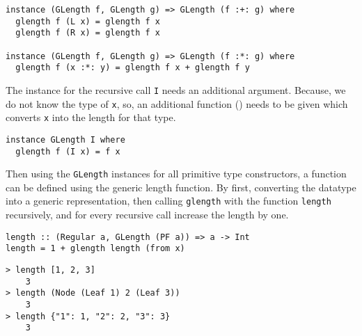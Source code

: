 \begin{verbatim}
instance (GLength f, GLength g) => GLength (f :+: g) where
  glength f (L x) = glength f x
  glength f (R x) = glength f x

instance (GLength f, GLength g) => GLength (f :*: g) where
  glength f (x :*: y) = glength f x + glength f y
\end{verbatim}

The instance for the recursive call \texttt{I} needs an additional argument. Because, we do not know the type of \texttt{x}, so, an additional function () needs to be given which converts \texttt{x} into the length for that type.

\begin{verbatim}
instance GLength I where
  glength f (I x) = f x
\end{verbatim}

Then using the \texttt{GLength} instances for all primitive type constructors, a function can be defined using the generic length function. By first, converting the datatype into a generic representation, then calling \texttt{glength} with the function \texttt{length} recursively, and for every recursive call increase the length by one. 

\begin{verbatim}
length :: (Regular a, GLength (PF a)) => a -> Int
length = 1 + glength length (from x)
\end{verbatim}

\begin{verbatim}
> length [1, 2, 3]
    3
> length (Node (Leaf 1) 2 (Leaf 3))
    3
> length {"1": 1, "2": 2, "3": 3}
    3
\end{verbatim}





